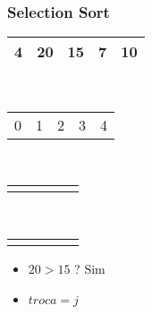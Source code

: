 \documentclass{beamer}
\begin{document}
\begin{frame}
    \frametitle{Selection Sort}
    \begin{center}
        \begin{table}
            \begin{tabular}{| p{0.25cm} | p{0.25cm} | p{0.25cm} | p{0.25cm} | p{0.25cm} |}
                \hline
                4 & 20 & 15 & 7 & 10 \\ \hline
            \end{tabular} \\
            \begin{tabular}{p{0.25cm} p{0.25cm} p{0.25cm} p{0.25cm} p{0.25cm}}
                0 & 1 & 2 & 3 & 4
            \end{tabular} \\
            \begin{tabular}{p{0.25cm} p{0.25cm} p{0.25cm} p{0.25cm} p{0.25cm}}
                 & \color{blue}{$\uparrow$} & \color{red}{$\uparrow$} & &
            \end{tabular} \\
            \begin{tabular}{p{0.25cm} p{0.25cm} p{0.25cm} p{0.25cm} p{0.25cm}}
                 & \color{blue}{i} & \color{red}{j} & &
            \end{tabular}
        \end{table}
	\end{center}
    \color{green}{$troca = 1$}
    \begin{itemize}[<+->]
        \item $20 > 15$ ? Sim
        \item $troca = j$
    \end{itemize}
\end{frame}
\end{document}
